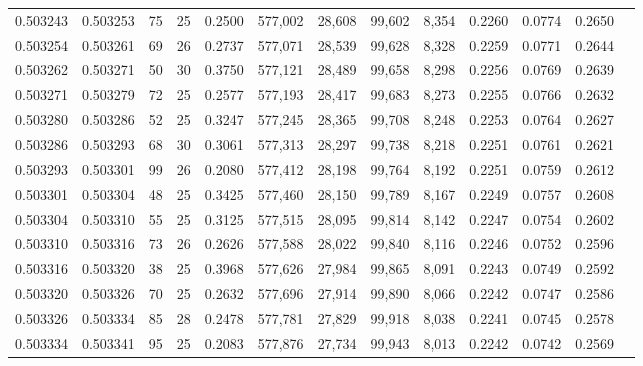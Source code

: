 \begin{tabular}{rrrrrrrrrrrrr}
0.503243 & 0.503253 &  75 &  25 &                                     0.2500 & 577,002 &  28,608 &  99,602 &   8,354 & 0.2260 & 0.0774 & 0.2650 \\
0.503254 & 0.503261 &  69 &  26 &                                     0.2737 & 577,071 &  28,539 &  99,628 &   8,328 & 0.2259 & 0.0771 & 0.2644 \\
0.503262 & 0.503271 &  50 &  30 &                                     0.3750 & 577,121 &  28,489 &  99,658 &   8,298 & 0.2256 & 0.0769 & 0.2639 \\
0.503271 & 0.503279 &  72 &  25 &                                     0.2577 & 577,193 &  28,417 &  99,683 &   8,273 & 0.2255 & 0.0766 & 0.2632 \\
0.503280 & 0.503286 &  52 &  25 &                                     0.3247 & 577,245 &  28,365 &  99,708 &   8,248 & 0.2253 & 0.0764 & 0.2627 \\
0.503286 & 0.503293 &  68 &  30 &                                     0.3061 & 577,313 &  28,297 &  99,738 &   8,218 & 0.2251 & 0.0761 & 0.2621 \\
0.503293 & 0.503301 &  99 &  26 &                                     0.2080 & 577,412 &  28,198 &  99,764 &   8,192 & 0.2251 & 0.0759 & 0.2612 \\
0.503301 & 0.503304 &  48 &  25 &                                     0.3425 & 577,460 &  28,150 &  99,789 &   8,167 & 0.2249 & 0.0757 & 0.2608 \\
0.503304 & 0.503310 &  55 &  25 &                                     0.3125 & 577,515 &  28,095 &  99,814 &   8,142 & 0.2247 & 0.0754 & 0.2602 \\
0.503310 & 0.503316 &  73 &  26 &                                     0.2626 & 577,588 &  28,022 &  99,840 &   8,116 & 0.2246 & 0.0752 & 0.2596 \\
0.503316 & 0.503320 &  38 &  25 &                                     0.3968 & 577,626 &  27,984 &  99,865 &   8,091 & 0.2243 & 0.0749 & 0.2592 \\
0.503320 & 0.503326 &  70 &  25 &                                     0.2632 & 577,696 &  27,914 &  99,890 &   8,066 & 0.2242 & 0.0747 & 0.2586 \\
0.503326 & 0.503334 &  85 &  28 &                                     0.2478 & 577,781 &  27,829 &  99,918 &   8,038 & 0.2241 & 0.0745 & 0.2578 \\
0.503334 & 0.503341 &  95 &  25 &                                     0.2083 & 577,876 &  27,734 &  99,943 &   8,013 & 0.2242 & 0.0742 & 0.2569 \\

\end{tabular}
